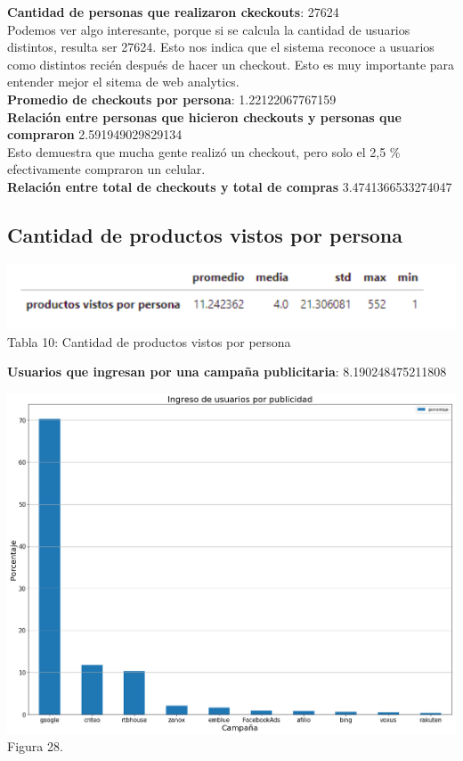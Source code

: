 \documentclass[a4paper ,12pt]{article}
\begin{document}
\textbf{Cantidad de personas que realizaron ckeckouts}:
27624\\


Podemos ver algo interesante, porque si se calcula la cantidad de usuarios distintos, resulta ser 27624. Esto nos indica que el sistema reconoce a usuarios como distintos recién después de hacer un checkout. Esto es muy importante para entender mejor el sitema de web analytics.\\


\textbf{Promedio de checkouts por persona}:
1.22122067767159 
\\

\textbf{Relación entre personas que hicieron checkouts y personas que compraron}
2.591949029829134\\

 
Esto demuestra que mucha gente realizó un checkout, pero solo el 2,5 \% efectivamente compraron un celular.\\

\textbf{Relación entre total de checkouts y total de compras}
3.4741366533274047
\newpage
\subsection{Cantidad de productos vistos por persona}

\begin{center}
	\includegraphics[width=0.9\linewidth]{table_10}\\
	Tabla 10: Cantidad de productos vistos por persona
	
\end{center}

\textbf{Usuarios que ingresan por una campaña publicitaria}:
8.190248475211808

\begin{center}
	\includegraphics[width=1.1\linewidth]{output_127_0}
	Figura 28.
	
\end{center}
\end{document}

